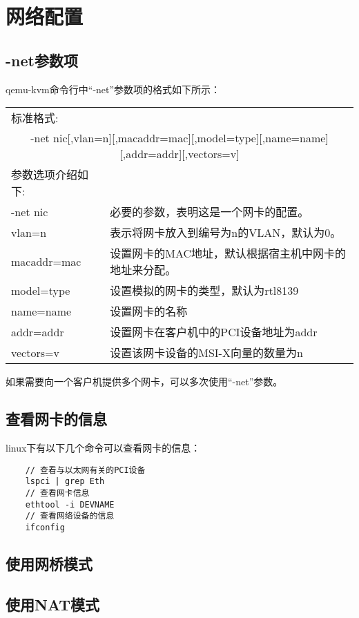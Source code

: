 \documentclass[a4paper,left=2.5cm,right=2.5cm,11pt]{article}
\newcommand{\interval}{\vspace{0.5em}}
\begin{document}
\clearpage

\section{网络配置}
\subsection{-net参数项}
	qemu-kvm命令行中“-net”参数项的格式如下所示：
	\interval
	\begin{longtable}{p{3cm}p{10cm}}
	\hline
	标准格式: & \\
	\multicolumn{2}{c}{-net nic[,vlan=n][,macaddr=mac][,model=type][,name=name][,addr=addr][,vectors=v]} \\
	\hline
	参数选项介绍如下: & \\
	\hline
	-net nic & 必要的参数，表明这是一个网卡的配置。 \\
	\hline
	vlan=n & 表示将网卡放入到编号为n的VLAN，默认为0。 \\
	\hline
	macaddr=mac & 设置网卡的MAC地址，默认根据宿主机中网卡的地址来分配。 \\
	\hline
	model=type & 设置模拟的网卡的类型，默认为rtl8139 \\
	\hline
	name=name & 设置网卡的名称 \\
	\hline
	addr=addr & 设置网卡在客户机中的PCI设备地址为addr \\
	\hline
	vectors=v & 设置该网卡设备的MSI-X向量的数量为n \\
	\hline
	\end{longtable}
	\interval

	如果需要向一个客户机提供多个网卡，可以多次使用“-net”参数。

\subsection{查看网卡的信息}
	linux下有以下几个命令可以查看网卡的信息：
	\begin{lstlisting}
	// 查看与以太网有关的PCI设备
	lspci | grep Eth
	// 查看网卡信息
	ethtool -i DEVNAME
	// 查看网络设备的信息
	ifconfig
	\end{lstlisting}

	

\subsection{使用网桥模式}
\subsection{使用NAT模式}
\end{document}
